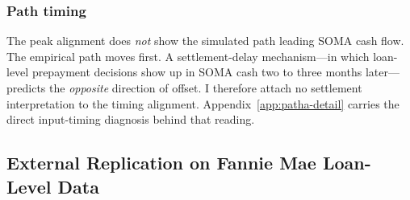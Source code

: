\documentclass[12pt]{article}
\begin{document}
\subsubsection{Path timing}

The peak alignment does \emph{not} show the simulated path leading SOMA cash flow. The empirical path moves first. A settlement-delay mechanism---in which loan-level prepayment decisions show up in SOMA cash two to three months later---predicts the \emph{opposite} direction of offset. I therefore attach no settlement interpretation to the timing alignment. Appendix~\ref{app:patha-detail} carries the direct input-timing diagnosis behind that reading.

\subsection{External Replication on Fannie Mae Loan-Level Data}\label{sec:pathb-fannie}
\end{document}
